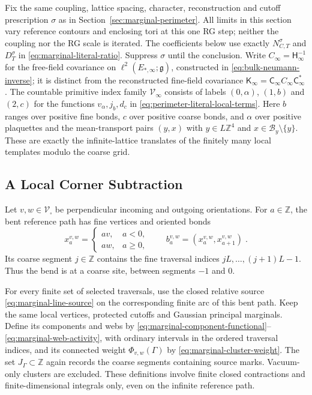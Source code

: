 \documentclass[11pt]{article}
\begin{document}
Fix the same coupling, lattice spacing, character, reconstruction and cutoff prescription $\sigma$ as in Section~\ref{sec:marginal-perimeter}. All limits in this section vary reference contours and enclosing tori at this one RG step; neither the coupling nor the RG scale is iterated. The coefficients below use exactly $N_{C,T}^{\sigma}$ and $D_T^{\sigma}$ in \eqref{eq:marginal-literal-ratio}. Suppress $\sigma$ until the conclusion. Write $C_\infty=\mathsf H_\infty^{-1}$ for the free-field covariance on $\ell^2(E_{*,\infty};\mathfrak g)$, constructed in \eqref{eq:bulk-neumann-inverse}; it is distinct from the reconstructed fine-field covariance $\mathsf K_\infty=\mathsf C_\infty C_\infty\mathsf C_\infty^*$. The countable primitive index family $\mathcal V_\infty$ consists of labels $(0,\alpha)$, $(1,b)$ and $(2,c)$ for the functions $v_\alpha,j_b,d_c$ in \eqref{eq:perimeter-literal-local-terms}. Here $b$ ranges over positive fine bonds, $c$ over positive coarse bonds, and $\alpha$ over positive plaquettes and the mean-transport pairs $(y,x)$ with $y\in L\mathbb Z^4$ and $x\in\mathcal B_y\setminus\{y\}$. These are exactly the infinite-lattice translates of the finitely many local templates modulo the coarse grid.

\subsection{A Local Corner Subtraction}

Let $v,w\in \mathscr V_\square$ be perpendicular incoming and outgoing orientations. For $a\in \mathbb Z$, the bent reference path has fine vertices and oriented bonds
\begin{equation}\label{eq:corner-bent-path}
    x_a^{v,w}=
    \begin{cases}
        av,&a<0,\\
        aw,&a\geq 0,
    \end{cases}
    \qquad b_a^{v,w}=(x_a^{v,w},x_{a+1}^{v,w})\;.
\end{equation}
Its coarse segment $j\in \mathbb Z$ contains the fine traversal indices $jL,\ldots,(j+1)L-1$. Thus the bend is at a coarse site, between segments $-1$ and $0$.

For every finite set of selected traversals, use the closed relative source \eqref{eq:marginal-line-source} on the corresponding finite arc of this bent path. Keep the same local vertices, protected cutoffs and Gaussian principal marginals. Define its components and webs by \eqref{eq:marginal-component-functional}--\eqref{eq:marginal-web-activity}, with ordinary intervals in the ordered traversal indices, and its connected weight $\Phi_{v,w}(\Gamma)$ by \eqref{eq:marginal-cluster-weight}. The set $J_\Gamma\subset \mathbb Z$ again records the coarse segments containing source marks. Vacuum-only clusters are excluded. These definitions involve finite closed contractions and finite-dimensional integrals only, even on the infinite reference path.
\end{document}
